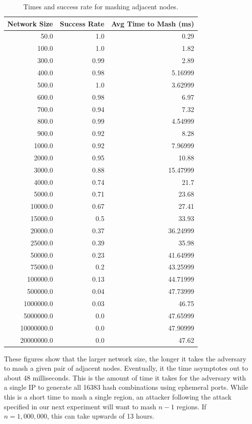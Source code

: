 \documentclass[11pt,conference]{IEEEtran}
\begin{document}
\begin{table}[h]\small
    \centering
    \caption{Times and success rate for mashing adjacent nodes.}
    \label{tab:exp1}
\begin{tabular}{|r|r|r|}
    \hline
    Network Size &  Success Rate &  Avg Time to Mash (ms) \\ \hline
    50.0 & 1.0 & 0.29 \\ \hline
    100.0 & 1.0 & 1.82 \\ \hline
    300.0 & 0.99 & 2.89 \\ \hline
    400.0 & 0.98 & 5.16999 \\ \hline
    500.0 & 1.0 & 3.62999 \\ \hline
    600.0 & 0.98 & 6.97 \\ \hline
    700.0 & 0.94 & 7.32 \\ \hline
    800.0 & 0.99 & 4.54999 \\ \hline
    900.0 & 0.92 & 8.28 \\ \hline
    1000.0 & 0.92 & 7.96999 \\ \hline
    2000.0 & 0.95 & 10.88 \\ \hline
    3000.0 & 0.88 & 15.47999 \\ \hline
    4000.0 & 0.74 & 21.7 \\ \hline
    5000.0 & 0.71 & 23.68 \\ \hline
    10000.0 & 0.67 & 27.41 \\ \hline
    15000.0 & 0.5 & 33.93 \\ \hline
    20000.0 & 0.37 & 36.24999 \\ \hline
    25000.0 & 0.39 & 35.98 \\ \hline
    50000.0 & 0.23 & 41.64999 \\ \hline
    75000.0 & 0.2 & 43.25999 \\ \hline
    100000.0 & 0.13 & 44.71999 \\ \hline
    500000.0 & 0.04 & 47.73999 \\ \hline
    1000000.0 & 0.03 & 46.75 \\ \hline
    5000000.0 & 0.0 & 47.65999 \\ \hline
    10000000.0 & 0.0 & 47.90999 \\ \hline
    20000000.0 & 0.0 & 47.62 \\ \hline
    
\end{tabular}
\end{table}
These figures show that the larger network size, the longer it takes the adversary to mash a given pair of adjacent nodes.
Eventually, it the time asymptotes out to about 48 milliseconds.
This is the amount of time it takes for the adversary with a single IP to generate all 16383 hash combinations using ephemeral ports.
While this is a short time to mash a single region, an attacker following the attack specified in our next experiment will want to mash $n-1$ regions.
If $n=1,000,000$, this can take upwards of 13 hours.
\end{document}
